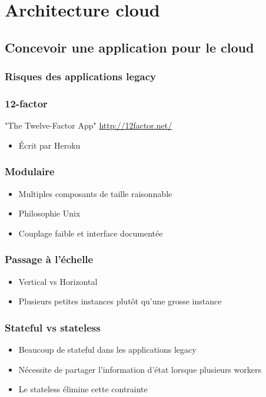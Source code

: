   \section[Architecture]{Architecture cloud}

  \subsection[Architecture dev]{Concevoir une application pour le cloud}

  \begin{frame}
    \frametitle{Risques des applications legacy}

  \end{frame}

  \begin{frame}
    \frametitle{12-factor}
    "The Twelve-Factor App" \url{http://12factor.net/}
    \begin{itemize}
      \item Écrit par Heroku
    \end{itemize}
  \end{frame}

  \begin{frame}
    \frametitle{Modulaire}
    \begin{itemize}
      \item Multiples composants de taille raisonnable
      \item Philosophie Unix
      \item Couplage faible et interface documentée
    \end{itemize}
  \end{frame}

  \begin{frame}
    \frametitle{Passage à l'échelle}
    \begin{itemize}
      \item Vertical vs Horizontal
      \item Plusieurs petites instances plutôt qu'une grosse instance
    \end{itemize}
  \end{frame}

  \begin{frame}
    \frametitle{Stateful vs stateless}
    \begin{itemize}
      \item Beaucoup de stateful dans les applications legacy
      \item Nécessite de partager l'information d'état lorsque plusieurs workers
      \item Le stateless élimine cette contrainte
    \end{itemize}
  \end{frame}

